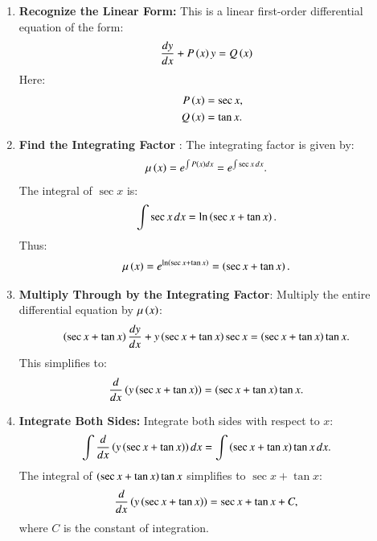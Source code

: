 \documentclass[journal]{IEEEtran}
\begin{document}
\begin{enumerate}
	\item \textbf{Recognize the Linear Form:}
  This is a linear first-order differential equation of the form:
  \begin{align}
	  \frac{dy}{dx} + P\left(x\right)y &= Q\left(x\right)
  \end{align}
  Here:
  \begin{align}
	  P\left(x\right) &= \sec x, \\
	  Q\left(x\right) &= \tan x.
  \end{align}

  \item \textbf{Find the Integrating Factor }:
  The integrating factor is given by:
  \begin{align}
	  \mu\left(x\right) &= e^{\int P\left(x\right) dx} = e^{\int \sec x \, dx}.
  \end{align}
  The integral of $\sec x$ is:
  \begin{align}
  \int \sec x \, dx &= \ln \left(\sec x + \tan x\right).
  \end{align}
  Thus:
  \begin{align}
	  \mu\left(x\right) &= e^{\ln \left(\sec x + \tan x\right)} = \left(\sec x + \tan x\right).
  \end{align}

  \item \textbf{Multiply Through by the Integrating Factor}:
	  Multiply the entire differential equation by $\mu\left(x\right)$:
  \begin{align}
  \left(\sec x + \tan x\right) \frac{dy}{dx} + y \left(\sec x + \tan x\right) \sec x &= \left(\sec x + \tan x\right) \tan x.
  \end{align}
  This simplifies to:
  \begin{align}
  \frac{d}{dx} \left(y \left(\sec x + \tan x\right)\right) &= \left(\sec x + \tan x\right) \tan x.
  \end{align}

  \item \textbf{Integrate Both Sides:}
  Integrate both sides with respect to $x$:
  \begin{align}
  \int \frac{d}{dx} \left(y \left(\sec x + \tan x\right)\right) dx &= \int \left(\sec x + \tan x\right) \tan x \, dx.
  \end{align}
  The integral of $\left(\sec x + \tan x\right) \tan x$ simplifies to $\sec x + \tan x$:
  \begin{align}
  \frac{d}{dx} \left(y \left(\sec x + \tan x\right)\right) &= \sec x + \tan x + C,
  \end{align}
  where $C$ is the constant of integration.


\end{enumerate}
\end{document}
